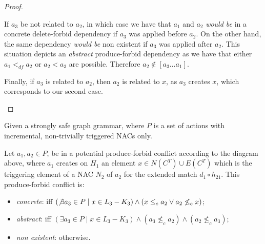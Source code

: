 \begin{proof}
\begin{description}[style=nextline,leftmargin=*]
    If $a_3$ be not related to $a_2$, in which case we have that $a_1$ and $a_2$ \emph{would be} in a concrete delete-forbid dependency if $a_3$ was applied before $a_2$. On the other hand, the same dependency \emph{would be} non existent if $a_3$ was applied after $a_2$. This situation depicts an \emph{abstract} produce-forbid dependency as we have that either $a_1 <_{df} a_2$ or $a_2 < a_3$ are possible. Therefore $a_2 \not\in [a_3 \ldots a_1]$.

  Finally, if $a_3$ is related to $a_2$, then $a_2$ is related to $x$, as $a_3$ creates $x$, which corresponds to our second case.
\end{description}
\end{proof}

\begin{definition}\label{def:produce-forbid-strong} Given \doublyTypedGraphGrammarCore{} a strongly safe graph grammar, where $P$ is a set of actions with incremental, non-trivially triggered NACs only.

\hfill

  Let $a_1,a_2 \in P$, be in a potential produce-forbid conflict according to the diagram above, where $a_1$ creates on $H_1$ an element $x \in N(C^T) \cup E(C^T)$ which is the triggering element of a NAC $N_2$ of $a_2$ for the extended match $d_1 \circ h_{21}$. This produce-forbid conflict is:

\begin{itemize}
  \item \emph{concrete}: iff $(\not\exists a_3 \in P \mid x \in L_3 - K_3) \land (x \leq_c a_2 \lor a_2 \not\leq_c x)$; %
  \item \emph{abstract}: iff $(\exists a_3 \in P \mid x \in L_3 - K_3) \land (a_3 \not\leq_c a_2) \land (a_2 \not\leq_c a_3)$;
  \item \emph{non existent}: otherwise.
\end{itemize}

\end{definition}


